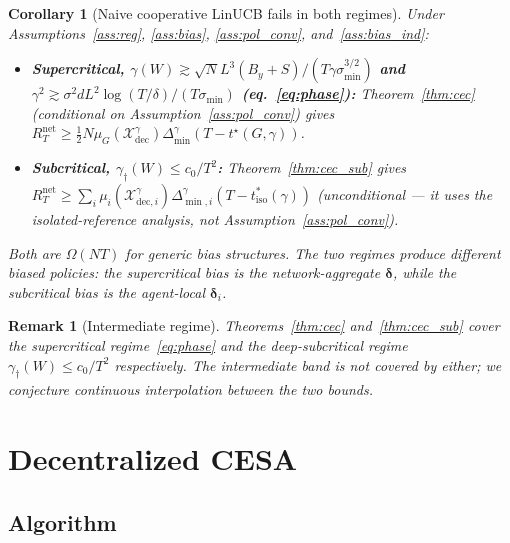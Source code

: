 \documentclass[11pt]{article}
\newtheorem{corollary}[theorem]{Corollary}
\newtheorem*{remark}{Remark}
\begin{document}
\begin{corollary}[Naive cooperative LinUCB fails in both regimes]
\label{cor:both}
Under Assumptions~\ref{ass:reg}, \ref{ass:bias}, \ref{ass:pol_conv},
and~\ref{ass:bias_ind}:
\begin{itemize}
\item \textbf{Supercritical,
$\gamma(W)\gtrsim\sqrt N L^3(B_y+S)/(T\gamma\sigma_{\min}^{3/2})$
and $\gamma^2\gtrsim\sigma^2 dL^2\log(T/\delta)/(T\sigma_{\min})$
(eq.~\eqref{eq:phase}):}
Theorem~\ref{thm:cec} (conditional on
Assumption~\ref{ass:pol_conv}) gives
$R_T^{\mathrm{net}}\geq \tfrac12 N\mu_G(\mathcal{X}_{\mathrm{dec}}^\gamma)
\Delta_{\min}^\gamma(T-t^\star(G,\gamma))$.
\item \textbf{Subcritical, $\gamma_\dagger(W)\leq c_0/T^2$:}
Theorem~\ref{thm:cec_sub} gives
$R_T^{\mathrm{net}}\geq\sum_i\mu_i(\mathcal{X}_{\mathrm{dec},i}^\gamma)
\Delta_{\min,i}^\gamma(T-t_{\mathrm{iso}}^*(\gamma))$
(unconditional --- it uses the isolated-reference analysis, not
Assumption~\ref{ass:pol_conv}).
\end{itemize}
Both are $\Omega(NT)$ for generic bias structures.  The two regimes
produce different biased policies: the supercritical bias is the
network-aggregate $\bm{\delta}$, while the subcritical bias is the
agent-local $\bm{\delta}_i$.
\end{corollary}

\begin{remark}[Intermediate regime]
Theorems~\ref{thm:cec} and~\ref{thm:cec_sub} cover the supercritical
regime~\eqref{eq:phase} and the deep-subcritical regime
$\gamma_\dagger(W)\leq c_0/T^2$ respectively.  The intermediate band is
not covered by either; we conjecture continuous interpolation between
the two bounds.
\end{remark}


\section{Decentralized CESA}\label{sec:dcesa}

\subsection{Algorithm}\label{sec:dcesa_algo}
\end{document}

